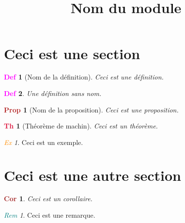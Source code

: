 \documentclass[a4paper,9pt]{article}
\title{\vspace{-1.2cm} Nom du module}
\date{}
\theoremstyle{persoth}%
\newtheorem*{thm}{\noindent\textcolor{Crimson}{Th}}
\newtheorem*{pop}{\noindent\textcolor{FireBrick}{Prop}}
\newtheorem*{cor}{\noindent\textcolor{Brown}{Cor}}
\theoremstyle{persodef}
\newtheorem*{defn}{\noindent\textcolor{magenta}{Def}}
\theoremstyle{remark}
\newtheorem*{rem}{\noindent\textcolor{Teal}{Rem}}
\newtheorem*{ex}{\noindent\textcolor{DarkOrange}{Ex}}
\begin{document}
\maketitle

\vspace{-1.5cm}

\section{Ceci est une section}

	\begin{defn}[Nom de la définition]
		Ceci est une définition.
	\end{defn}
	
	\begin{defn}
		Une définition sans nom.
	\end{defn}
	
	\begin{pop}[Nom de la proposition]
		Ceci est une proposition.
	\end{pop}

	\begin{thm}[Théorème de machin]
		Ceci est un théorème.
	\end{thm}

	\begin{ex}
		Ceci est un exemple.
	\end{ex}

\section{Ceci est une autre section}

	\begin{cor}
		Ceci est un corollaire.
	\end{cor}
	
	\begin{rem}
		Ceci est une remarque.
	\end{rem}
\end{document}
